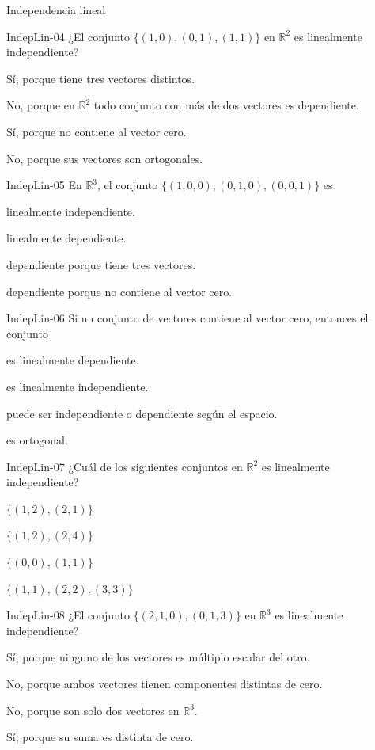 \documentclass[a4,11pt]{aleph-notas}
\begin{document}
\begin{quiz}{Independencia lineal}
\begin{multi}[]%
    {IndepLin-04}
    ¿El conjunto \(\{(1,0),(0,1),(1,1)\}\) en \(\mathbb{R}^2\) es linealmente independiente?
    \item Sí, porque tiene tres vectores distintos.
    \item* No, porque en \(\mathbb{R}^2\) todo conjunto con más de dos vectores es dependiente.
    \item Sí, porque no contiene al vector cero.
    \item No, porque sus vectores son ortogonales.
\end{multi}

\begin{multi}[]%
    {IndepLin-05}
    En \(\mathbb{R}^3\), el conjunto \(\{(1,0,0),(0,1,0),(0,0,1)\}\) es
    \item* linealmente independiente.
    \item linealmente dependiente.
    \item dependiente porque tiene tres vectores.
    \item dependiente porque no contiene al vector cero.
\end{multi}

\begin{multi}[]%
    {IndepLin-06}
    Si un conjunto de vectores contiene al vector cero, entonces el conjunto
    \item* es linealmente dependiente.
    \item es linealmente independiente.
    \item puede ser independiente o dependiente según el espacio.
    \item es ortogonal.
\end{multi}

\begin{multi}[]%
    {IndepLin-07}
    ¿Cuál de los siguientes conjuntos en \(\mathbb{R}^2\) es linealmente independiente?
    \item* \(\{(1,2),(2,1)\}\)
    \item \(\{(1,2),(2,4)\}\)
    \item \(\{(0,0),(1,1)\}\)
    \item \(\{(1,1),(2,2),(3,3)\}\)
\end{multi}

\begin{multi}[]%
    {IndepLin-08}
    ¿El conjunto \(\{(2,1,0),(0,1,3)\}\) en \(\mathbb{R}^3\) es linealmente independiente?
    \item* Sí, porque ninguno de los vectores es múltiplo escalar del otro.
    \item No, porque ambos vectores tienen componentes distintas de cero.
    \item No, porque son solo dos vectores en \(\mathbb{R}^3\).
    \item Sí, porque su suma es distinta de cero.
\end{multi}


\end{quiz}
\end{document}
